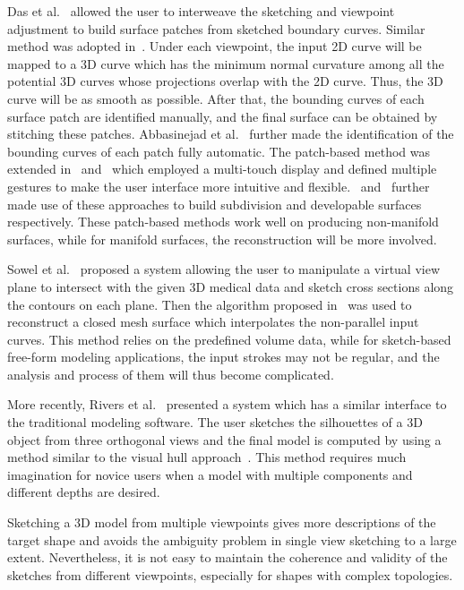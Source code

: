 Das et al.~\cite{KPG05} allowed the user to  interweave the
sketching and viewpoint adjustment to build surface patches from
sketched boundary curves. Similar method was adopted
in~\cite{KDS06,KS07,BHSF09}. Under each viewpoint, the input 2D
curve will be mapped to a 3D curve which has the minimum normal
curvature among all the potential 3D curves whose projections
overlap with the 2D curve. Thus, the 3D curve will be as smooth as
possible. After that, the bounding curves of each surface patch are
identified manually, and the final surface can be obtained by
stitching these patches. Abbasinejad et al.~\cite{AJA12} further
made the identification of the bounding curves of each patch fully
automatic. The patch-based method was extended in~\cite{BBS08}
and~\cite{BBS09} which employed a multi-touch display and defined
multiple gestures to make the user interface more intuitive and
flexible.~\cite{OK11} and~\cite{RSWCT07} further made use of these
approaches to build subdivision and developable surfaces
respectively. These patch-based methods work well on producing
non-manifold surfaces, while for manifold surfaces, the
reconstruction will be more involved.

Sowel et al.~\cite{SLJGAGL09} proposed a  system allowing the user
to manipulate a virtual view plane to intersect with the given 3D
medical data and sketch cross sections along the contours on each
plane. Then the algorithm proposed in~\cite{LBDLJ08} was used to
reconstruct a closed mesh surface which interpolates the
non-parallel input curves. This method relies on the predefined
volume data, while for sketch-based free-form modeling applications,
the input strokes may not be regular, and the analysis and process
of them will thus become complicated.

More recently, Rivers et al.~\cite{RDI10}  presented a system which
has a similar interface to the traditional modeling software. The
user sketches the silhouettes of a 3D object from three orthogonal
views and the final model is computed by using a method similar to
the visual hull approach~\cite{LA94}. This method requires much
imagination for novice users when a model with multiple components
and different depths are desired.

Sketching a 3D model from multiple viewpoints  gives more
descriptions of the target shape and avoids the ambiguity problem in
single view sketching to a large extent. Nevertheless, it is not
easy to maintain the coherence and validity of the sketches from
different viewpoints, especially for shapes with complex topologies.

